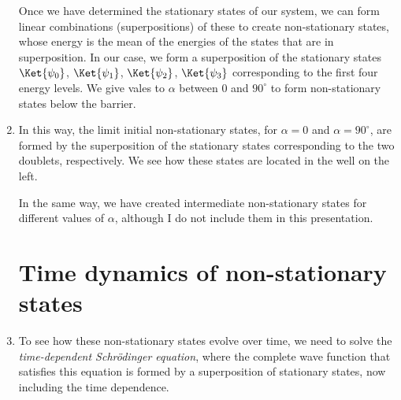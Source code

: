 \documentclass[12pt, a4paper]{article}
\begin{document}
\begin{enumerate}[label=\textbf{Slide \arabic*.}]
    Once we have determined the stationary states of our system, we can form linear combinations (superpositions) of these to create non-stationary states, whose energy is the mean of the energies of the states that are in superposition. In our case, we form a superposition of the stationary states $\Ket{\psi_0}$, $\Ket{\psi_1}$, $\Ket{\psi_2}$, $\Ket{\psi_3}$ corresponding to the first four energy levels. We give vales to $\alpha$ between $0$ and $90^{\circ}$ to form non-stationary states below the barrier.

    \item In this way, the limit initial non-stationary states, for $\alpha=0$ and $\alpha=90^{\circ}$, are formed by the superposition of the stationary states corresponding to the two doublets, respectively. We see how these states are located in the well on the left.

        In the same way, we have created intermediate non-stationary states for different values of $\alpha$, although I do not include them in this presentation.

        \section{Time dynamics of non-stationary states}

    \item To see how these non-stationary states evolve over time, we need to solve the \textit{time-dependent Schrödinger equation}, where the complete wave function that satisfies this equation is formed by a superposition of stationary states, now including the time dependence.


\end{enumerate}
\end{document}
